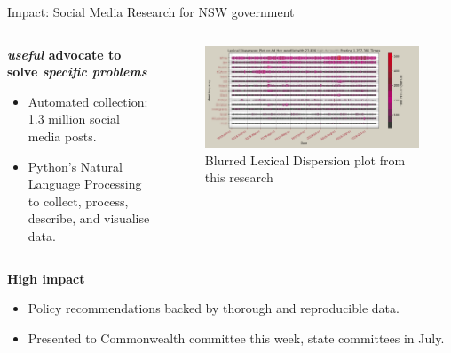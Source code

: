 \documentclass[aspectratio=169, 11pt]{beamer} %
\begin{document}
\begin{frame}{Impact: Social Media Research for NSW government}
\begin{columns}[t]
\begin{column}{.35\textwidth}
\textbf{\textit{useful} advocate to solve \textit{specific problems}}
\begin{itemize}
    \item Automated collection: 1.3 million social media posts.
    \item Python's Natural Language Processing to collect, process, describe, and visualise data.
\end{itemize}

\end{column}
\begin{column}{.55\textwidth}
\begin{figure}
    \vspace{-.5cm}
    \centering
    \includegraphics[width=\textwidth]{figures/blur.png}
    \caption{Blurred Lexical Dispersion plot from this research}
\end{figure}
\end{column}
\end{columns}
\textbf{High impact}
\begin{itemize}
    \item Policy recommendations backed by thorough and reproducible data. 
    \item Presented to Commonwealth committee this week, state committees in July.

    
\end{itemize}
\end{frame}
\end{document}
